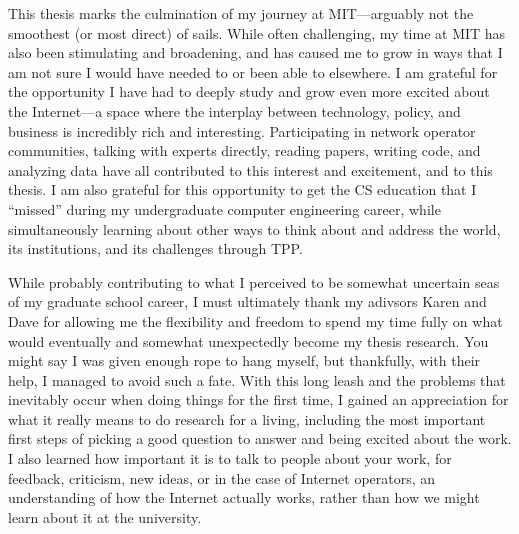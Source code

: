 This thesis marks the culmination of my journey at MIT---arguably not the
smoothest (or most direct) of sails. While often challenging, my time at MIT
has also been stimulating and broadening, and has caused me to grow in ways
that I am not sure I would have needed to or been able to elsewhere. I am
grateful for the opportunity I have had to deeply study and grow even more
excited about the Internet---a space where the interplay between technology,
policy, and business is incredibly rich and interesting. Participating in
network operator communities, talking with experts directly, reading papers,
writing code, and analyzing data have all contributed to this interest and
excitement, and to this thesis. I am also grateful for this opportunity to get
the CS education that I ``missed'' during my undergraduate computer engineering
career, while simultaneously learning about other ways to think about and
address the world, its institutions, and its challenges through TPP.

While probably contributing to what I perceived to be somewhat uncertain seas
of my graduate school career, I must ultimately thank my adivsors Karen and
Dave for allowing me the flexibility and freedom to spend my time fully on what
would eventually and somewhat unexpectedly become my thesis research. You might
say I was given enough rope to hang myself, but thankfully, with their help, I
managed to avoid such a fate. With this long leash and the problems that
inevitably occur when doing things for the first time, I gained an appreciation
for what it really means to do research for a living, including the most
important first steps of picking a good question to answer and being excited
about the work. I also learned how important it is to talk to people about your
work, for feedback, criticism, new ideas, or in the case of Internet operators,
an understanding of how the Internet actually works, rather than how we might
learn about it at the university.

%


